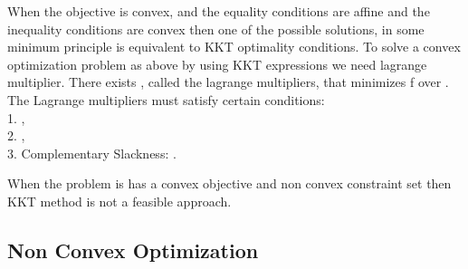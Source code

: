 \par
When the objective is convex, and the equality conditions are affine and the inequality conditions are convex then one of the possible solutions, in some minimum principle is equivalent to \ac{KKT} optimality conditions. To solve a convex optimization problem as above by using \ac{KKT} expressions we need lagrange multiplier. There exists , called the lagrange multipliers,  that minimizes f over . The Lagrange multipliers must satisfy certain conditions:\\
1. ,\\
2. ,\\
3. Complementary Slackness: .\\
\par 
When the problem is has a convex objective and non convex constraint set then \ac{KKT} method is not a feasible approach. 


\subsection{Non Convex Optimization}

